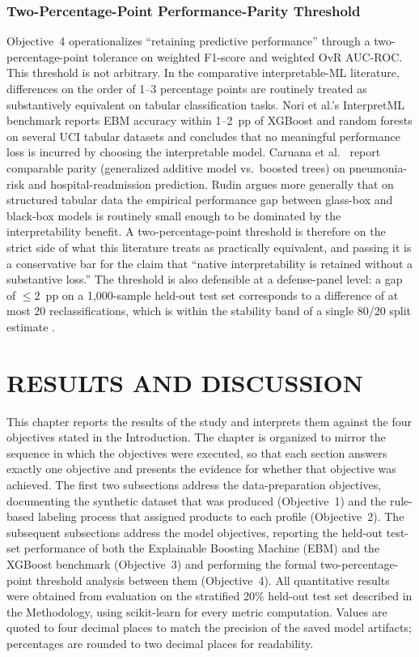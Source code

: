 \documentclass{icsthesis}
\begin{document}
\begin{mainmatter}
				\subsubsection{Two-Percentage-Point Performance-Parity Threshold}
					Objective~4 operationalizes ``retaining predictive performance'' through a two-percentage-point tolerance on weighted F1-score and weighted OvR AUC-ROC. This threshold is not arbitrary. In the comparative interpretable-ML literature, differences on the order of 1--3 percentage points are routinely treated as substantively equivalent on tabular classification tasks. Nori et al.'s \cite{ref15} InterpretML benchmark reports EBM accuracy within 1--2~pp of XGBoost and random forests on several UCI tabular datasets and concludes that no meaningful performance loss is incurred by choosing the interpretable model. Caruana et al.\ \cite{ref50} report comparable parity (generalized additive model vs.\ boosted trees) on pneumonia-risk and hospital-readmission prediction. Rudin \cite{ref51} argues more generally that on structured tabular data the empirical performance gap between glass-box and black-box models is routinely small enough to be dominated by the interpretability benefit. A two-percentage-point threshold is therefore on the strict side of what this literature treats as practically equivalent, and passing it is a conservative bar for the claim that ``native interpretability is retained without a substantive loss.'' The threshold is also defensible at a defense-panel level: a gap of $\leq 2$~pp on a 1{,}000-sample held-out test set corresponds to a difference of at most 20 reclassifications, which is within the stability band of a single 80/20 split estimate \cite{ref68}.

		
		\section{RESULTS AND DISCUSSION}
		This chapter reports the results of the study and interprets them against the four objectives stated in the Introduction. The chapter is organized to mirror the sequence in which the objectives were executed, so that each section answers exactly one objective and presents the evidence for whether that objective was achieved. The first two subsections address the data-preparation objectives, documenting the synthetic dataset that was produced (Objective~1) and the rule-based labeling process that assigned products to each profile (Objective~2). The subsequent subsections address the model objectives, reporting the held-out test-set performance of both the Explainable Boosting Machine (EBM) and the XGBoost benchmark (Objective~3) and performing the formal two-percentage-point threshold analysis between them (Objective~4). All quantitative results were obtained from evaluation on the stratified 20\% held-out test set described in the Methodology, using scikit-learn \cite{ref74} for every metric computation. Values are quoted to four decimal places to match the precision of the saved model artifacts; percentages are rounded to two decimal places for readability.


\end{mainmatter}
\end{document}
